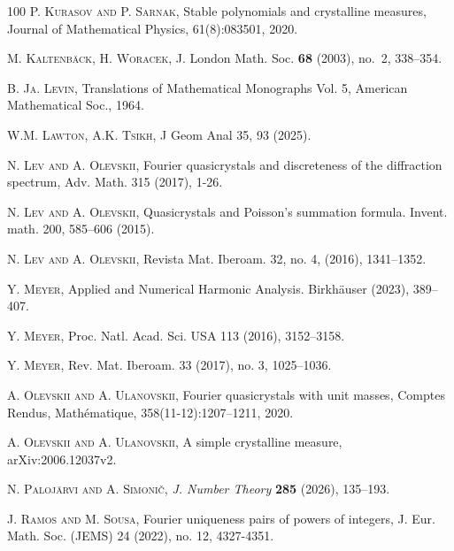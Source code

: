 \documentclass[a4paper,reqno,12pt]{amsart}
\newcommand{\1}{{\bf 1}}
\begin{document}
\begin{thebibliography}{100}
\textsc{P. Kurasov and P. Sarnak}, Stable polynomials and crystalline measures, Journal of Mathematical Physics, 61(8):083501, 2020.


\textsc{M. Kaltenbäck, H. Woracek},
\newblock J. London Math. Soc. {\bf 68} (2003), no.~2, 338--354.

\textsc{B. Ja. Levin},
\newblock Translations of Mathematical Monographs Vol. 5, American Mathematical Soc., 1964.

\textsc{W.M. Lawton, A.K. Tsikh},
\newblock J Geom Anal 35, 93 (2025).

 \textsc{N. Lev and A. Olevskii}, Fourier quasicrystals and discreteness of the diffraction spectrum, Adv. Math. 315 (2017), 1-26.

 \textsc{N. Lev and A. Olevskii}, Quasicrystals and Poisson’s summation formula. Invent. math. 200, 585–606 (2015).

\textsc{N. Lev and A. Olevskii},
\newblock Revista Mat. Iberoam. 32, no. 4, (2016), 1341–1352.

\textsc{Y. Meyer},
\newblock Applied and Numerical Harmonic Analysis. Birkhäuser (2023), 389--407.


\textsc{Y. Meyer},
\newblock Proc. Natl. Acad. Sci. USA 113 (2016), 3152--3158.

\textsc{Y. Meyer},
\newblock Rev. Mat. Iberoam. 33 (2017), no. 3, 1025–1036.

\textsc{A. Olevskii and A. Ulanovskii}, Fourier quasicrystals with unit masses, Comptes Rendus, Mathématique, 358(11-12):1207–1211, 2020.


\textsc{A. Olevskii and A. Ulanovskii}, A simple crystalline measure, arXiv:2006.12037v2.

\textsc{N. Paloj\"arvi and A. Simoni\v{c}},
\newblock \emph{J. Number Theory} \textbf{285} (2026), 135--193.

\textsc{J. Ramos and M. Sousa}, Fourier uniqueness pairs of powers of integers, J. Eur. Math. Soc. (JEMS) 24 (2022), no. 12, 4327-4351.



\end{thebibliography}
\end{document}
